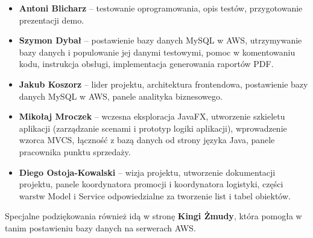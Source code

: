 \documentclass[a4paper,12pt]{article}
\begin{document}
\begin{itemize}
    \item \textbf{Antoni Blicharz} -- testowanie oprogramowania, opis testów, przygotowanie prezentacji demo.
    \item \textbf{Szymon Dybał} -- postawienie bazy danych MySQL w AWS, utrzymywanie bazy danych i populowanie jej danymi testowymi, pomoc w komentowaniu kodu, instrukcja obsługi, implementacja generowania raportów PDF.
    \item \textbf{Jakub Koszorz} -- lider projektu, architektura frontendowa, postawienie bazy danych MySQL w AWS, panele analityka biznesowego.
    \item \textbf{Mikołaj Mroczek} -- wczesna eksploracja JavaFX, utworzenie szkieletu aplikacji (zarządzanie scenami i prototyp logiki aplikacji), wprowadzenie wzorca MVCS, łączność z bazą danych od strony języka Java, panele pracownika punktu sprzedaży.
    \item \textbf{Diego Ostoja-Kowalski} -- wizja projektu, utworzenie dokumentacji projektu, panele koordynatora promocji i koordynatora logistyki, części warstw Model i Service odpowiedzialne za tworzenie list i tabel obiektów.
\end{itemize}

\newpage

Specjalne podziękowania również idą w stronę \textbf{Kingi Żmudy}, która pomogła w tanim postawieniu bazy danych na serwerach AWS.
\end{document}
